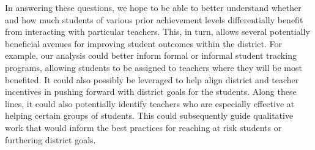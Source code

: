 \documentclass[letterpaper,12pt]{article}
\begin{document}
In answering these questions, we hope to be able to better understand whether and how much students of various prior achievement levels differentially benefit from interacting with particular teachers. This, in turn, allows several potentially beneficial avenues for improving student outcomes within the district. For example, our analysis could better inform formal or informal student tracking programs, allowing students to be assigned to teachers where they will be most benefited. It could also possibly be leveraged to help align district and teacher incentives in pushing forward with district goals for the students. Along these lines, it could also potentially identify teachers who are especially effective at helping certain groups of students. This could subsequently guide qualitative work that would inform the best practices for reaching at risk students or furthering district goals.



    
\end{document}
